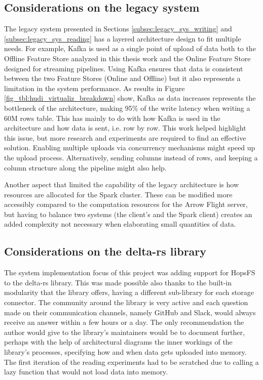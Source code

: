 \subsection{Considerations on the legacy system}

The legacy system presented in Sections \ref{subsec:legacy_sys_writing} and \ref{subsec:legacy_sys_reading} has a layered architecture design to fit multiple needs. For example, Kafka is used as a single point of upload of data both to the Offline Feature Store analyzed in this thesis work and the Online Feature Store designed for streaming pipelines. Using Kafka ensures that data is consistent between the two Feature Stores (Online and Offline) but it also represents a limitation in the system performance. As results in Figure \ref{fig_tbl:hudi_virtualiz_breakdown} show, Kafka as data increases represents the bottleneck of the architecture, making 95\% of the write latency when writing a 60M rows table. This has mainly to do with how Kafka is used in the architecture and how data is sent, i.e. row by row. 
This work helped highlight this issue, but more research and experiments are required to find an effective solution. Enabling multiple uploads via concurrency mechanisms might speed up the upload process. Alternatively, sending columns instead of rows, and keeping a column structure along the pipeline might also help. 

Another aspect that limited the capability of the legacy architecture is how resources are allocated for the Spark cluster. These can be modified more accessibly compared to the computation resources for the Arrow Flight server, but having to balance two systems (the client's and the Spark client) creates an added complexity not necessary when elaborating small quantities of data.

\subsection{Considerations on the delta-rs library}

The system implementation focus of this project was adding support for \gls{HopsFS} to the delta-rs library. This was made possible also thanks to the built-in modularity that the library offers, having a different sub-library for each storage connector. The community around the library is very active and each question made on their communication channels, namely GitHub and Slack, would always receive an answer within a few hours or a day. The only recommendation the author would give to the library's maintainers would be to document further, perhaps with the help of architectural diagrams the inner workings of the library's processes, specifying how and when data gets uploaded into memory. The first iteration of the reading experiments had to be scratched due to calling a lazy function that would not load data into memory. 

